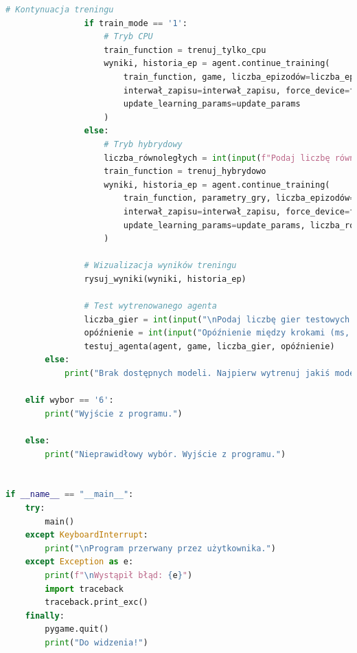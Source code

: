 \documentclass[a4paper,12pt]{article}
\begin{document}
\begin{lstlisting}[language=Python]
                # Kontynuacja treningu
                if train_mode == '1':
                    # Tryb CPU
                    train_function = trenuj_tylko_cpu
                    wyniki, historia_ep = agent.continue_training(
                        train_function, game, liczba_epizodów=liczba_epizodów, 
                        interwał_zapisu=interwał_zapisu, force_device=force_device,
                        update_learning_params=update_params
                    )
                else:
                    # Tryb hybrydowy
                    liczba_równoległych = int(input(f"Podaj liczbę równoległych gier (zalecane: {LICZBA_WĄTKÓW_CPU}-16): ") or str(LICZBA_WĄTKÓW_CPU))
                    train_function = trenuj_hybrydowo
                    wyniki, historia_ep = agent.continue_training(
                        train_function, parametry_gry, liczba_epizodów=liczba_epizodów, 
                        interwał_zapisu=interwał_zapisu, force_device=force_device,
                        update_learning_params=update_params, liczba_równoległych=liczba_równoległych
                    )
            
                # Wizualizacja wyników treningu
                rysuj_wyniki(wyniki, historia_ep)
            
                # Test wytrenowanego agenta
                liczba_gier = int(input("\nPodaj liczbę gier testowych: ") or "5")
                opóźnienie = int(input("Opóźnienie między krokami (ms, 0-500): ") or "100")
                testuj_agenta(agent, game, liczba_gier, opóźnienie)
        else:
            print("Brak dostępnych modeli. Najpierw wytrenuj jakiś model.")

    elif wybor == '6':
        print("Wyjście z programu.")
    
    else:
        print("Nieprawidłowy wybór. Wyjście z programu.")


if __name__ == "__main__":
    try:
        main()
    except KeyboardInterrupt:
        print("\nProgram przerwany przez użytkownika.")
    except Exception as e:
        print(f"\nWystąpił błąd: {e}")
        import traceback
        traceback.print_exc()
    finally:
        pygame.quit()
        print("Do widzenia!")
\end{lstlisting}
\end{document}
